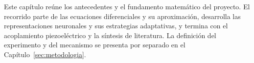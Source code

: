 \label{sec:marco-teorico}
Este capítulo reúne los antecedentes y el fundamento matemático del proyecto. El recorrido parte de las ecuaciones diferenciales y su aproximación, desarrolla las representaciones neuronales y sus estrategias adaptativas, y termina con el acoplamiento piezoeléctrico y la síntesis de literatura. La definición del experimento y del mecanismo se presenta por separado en el Capítulo~\ref{sec:metodologia}.





